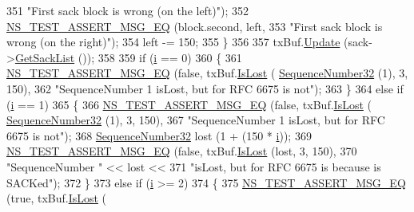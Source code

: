 \begin{DoxyCode}
351                                  \textcolor{stringliteral}{"First sack block is wrong (on the left)"});
352           \hyperlink{group__testing_ga2a9d78cffb3db8e867c35fff0b698cf5}{NS\_TEST\_ASSERT\_MSG\_EQ} (block.second, left,
353                                  \textcolor{stringliteral}{"First sack block is wrong (on the right)"});
354           left -= 150;
355         \}
356 
357       txBuf.\hyperlink{classns3_1_1TcpTxBuffer_abed2d31821b2d946068c517195f5cc61}{Update} (sack->\hyperlink{classns3_1_1TcpOptionSack_a08840a554682aeb3aadbccfbb1f6b6fa}{GetSackList} ());
358 
359       \textcolor{keywordflow}{if} (\hyperlink{bernuolliDistribution_8m_a6f6ccfcf58b31cb6412107d9d5281426}{i} == 0)
360         \{
361           \hyperlink{group__testing_ga2a9d78cffb3db8e867c35fff0b698cf5}{NS\_TEST\_ASSERT\_MSG\_EQ} (\textcolor{keyword}{false}, txBuf.\hyperlink{classns3_1_1TcpTxBuffer_add55043ebbafc30ba4e48d3f8aa9f064}{IsLost} (
      \hyperlink{classns3_1_1SequenceNumber}{SequenceNumber32} (1), 3, 150),
362                                  \textcolor{stringliteral}{"SequenceNumber 1 isLost, but for RFC 6675 is not"});
363         \}
364       \textcolor{keywordflow}{else} \textcolor{keywordflow}{if} (\hyperlink{bernuolliDistribution_8m_a6f6ccfcf58b31cb6412107d9d5281426}{i} == 1)
365         \{
366           \hyperlink{group__testing_ga2a9d78cffb3db8e867c35fff0b698cf5}{NS\_TEST\_ASSERT\_MSG\_EQ} (\textcolor{keyword}{false}, txBuf.\hyperlink{classns3_1_1TcpTxBuffer_add55043ebbafc30ba4e48d3f8aa9f064}{IsLost} (
      \hyperlink{classns3_1_1SequenceNumber}{SequenceNumber32} (1), 3, 150),
367                                  \textcolor{stringliteral}{"SequenceNumber 1 isLost, but for RFC 6675 is not"});
368           \hyperlink{classns3_1_1SequenceNumber}{SequenceNumber32} lost (1 + (150 * \hyperlink{bernuolliDistribution_8m_a6f6ccfcf58b31cb6412107d9d5281426}{i}));
369           \hyperlink{group__testing_ga2a9d78cffb3db8e867c35fff0b698cf5}{NS\_TEST\_ASSERT\_MSG\_EQ} (\textcolor{keyword}{false}, txBuf.\hyperlink{classns3_1_1TcpTxBuffer_add55043ebbafc30ba4e48d3f8aa9f064}{IsLost} (lost, 3, 150),
370                                  \textcolor{stringliteral}{"SequenceNumber "} << lost <<
371                                  \textcolor{stringliteral}{"isLost, but for RFC 6675 is because is SACKed"});
372         \}
373       \textcolor{keywordflow}{else} \textcolor{keywordflow}{if} (\hyperlink{bernuolliDistribution_8m_a6f6ccfcf58b31cb6412107d9d5281426}{i} >= 2)
374         \{
375           \hyperlink{group__testing_ga2a9d78cffb3db8e867c35fff0b698cf5}{NS\_TEST\_ASSERT\_MSG\_EQ} (\textcolor{keyword}{true}, txBuf.\hyperlink{classns3_1_1TcpTxBuffer_add55043ebbafc30ba4e48d3f8aa9f064}{IsLost} (

\end{DoxyCode}
